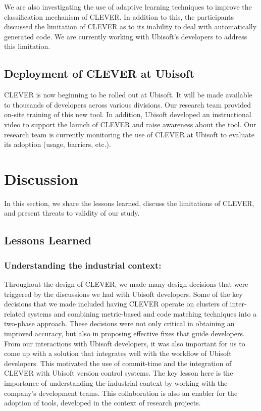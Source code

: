 \documentclass[sigconf]{acmart}
\begin{document}
We are also investigating the use of adaptive learning techniques to
improve the classification mechanism of CLEVER. In addition to this, the
participants discussed the limitation of CLEVER as to its inability to
deal with automatically generated code. We are currently working with
Ubisoft's developers to address this limitation.

\subsection{Deployment of CLEVER at
Ubisoft}\label{deployment-of-clever-at-ubisoft}

CLEVER is now beginning to be rolled out at Ubisoft. It will be made
available to thousands of developers across various divisions. Our
research team provided on-site training of this new tool. In addition,
Ubisoft developed an instructional video to support the launch of CLEVER
and raise awareness about the tool. Our research team is currently
monitoring the use of CLEVER at Ubisoft to evaluate its adoption (usage,
barriers, etc.).

\section{Discussion}\label{sec:threats}

In this section, we share the lessons learned, discuss the limitations
of CLEVER, and present threats to validity of our study.

\subsection{Lessons Learned}\label{lessons-learned}

\subsubsection{Understanding the industrial
context:}\label{understanding-the-industrial-context}

Throughout the design of CLEVER, we made many design decisions that were
triggered by the discussions we had with Ubisoft developers. Some of the
key decisions that we made included having CLEVER operate on clusters of
inter-related systems and combining metric-based and code matching
techniques into a two-phase approach. These decisions were not only
critical in obtaining an improved accuracy, but also in proposing
effective fixes that guide developers. From our interactions with
Ubisoft developers, it was also important for us to come up with a
solution that integrates well with the workflow of Ubisoft developers.
This motivated the use of commit-time and the integration of CLEVER with
Ubisoft version control systems. The key lesson here is the importance
of understanding the industrial context by working with the company's
development teams. This collaboration is also an enabler for the
adoption of tools, developed in the context of research projects.
\end{document}
